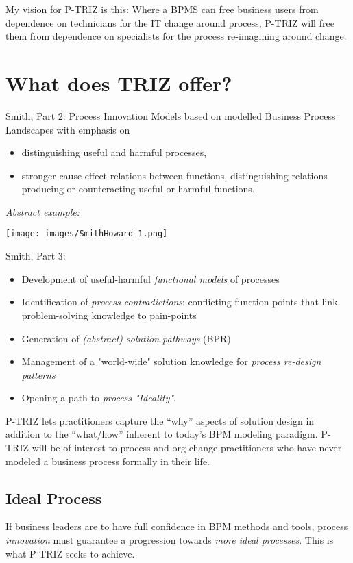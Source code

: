 \documentclass[11pt,a4paper]{article}
\begin{document}
My vision for P-TRIZ is this: Where a BPMS can free business users from
dependence on technicians for the IT change around process, P-TRIZ will free
them from dependence on specialists for the process re-imagining around
change.

\section{What does TRIZ offer?}

Smith, Part 2: Process Innovation Models based on modelled Business Process
Landscapes with emphasis on
\begin{itemize}
\item distinguishing useful and harmful processes,
\item stronger cause-effect relations between functions, distinguishing
  relations producing or counteracting useful or harmful functions.
\end{itemize}
\emph{Abstract example:} 
\begin{center}
  \texttt{[image: images/SmithHoward-1.png]}
\end{center}
Smith, Part 3: 
\begin{itemize}
\item Development of useful-harmful \emph{functional models} of processes
\item Identification of \emph{process-contradictions}: conflicting function
  points that link problem-solving knowledge to pain-points
\item Generation of \emph{(abstract) solution pathways} (BPR) 
\item Management of a "world-wide" solution knowledge for \emph{process
  re-design patterns}
\item Opening a path to \emph{process "Ideality"}.
\end{itemize}

P-TRIZ lets practitioners capture the “why” aspects of solution design in
addition to the “what/how” inherent to today’s BPM modeling paradigm. P-TRIZ
will be of interest to process and org-change practitioners who have never
modeled a business process formally in their life.

\subsection{Ideal Process}

If business leaders are to have full confidence in BPM methods and tools,
process \emph{innovation} must guarantee a progression towards \emph{more
  ideal processes}. This is what P-TRIZ seeks to achieve.
\end{document}

